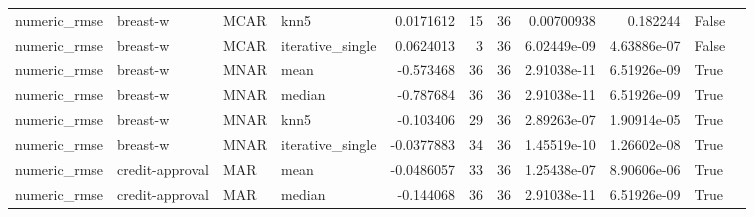 \begin{table}[ht]
\begin{tabular}{llllrrrrrll}
 numeric\_rmse           & breast-w             & MCAR        & knn5             &      0.0171612   &                  15 &      36 & 0.00700938  & 0.182244    & False              &                                                                                                                    \\
 numeric\_rmse           & breast-w             & MCAR        & iterative\_single &      0.0624013   &                   3 &      36 & 6.02449e-09 & 4.63886e-07 & False              &                                                                                                                    \\
 numeric\_rmse           & breast-w             & MNAR        & mean             &     -0.573468    &                  36 &      36 & 2.91038e-11 & 6.51926e-09 & True               &                                                                                                                    \\
 numeric\_rmse           & breast-w             & MNAR        & median           &     -0.787684    &                  36 &      36 & 2.91038e-11 & 6.51926e-09 & True               &                                                                                                                    \\
 numeric\_rmse           & breast-w             & MNAR        & knn5             &     -0.103406    &                  29 &      36 & 2.89263e-07 & 1.90914e-05 & True               &                                                                                                                    \\
 numeric\_rmse           & breast-w             & MNAR        & iterative\_single &     -0.0377883   &                  34 &      36 & 1.45519e-10 & 1.26602e-08 & True               &                                                                                                                    \\
 numeric\_rmse           & credit-approval      & MAR         & mean             &     -0.0486057   &                  33 &      36 & 1.25438e-07 & 8.90606e-06 & True               &                                                                                                                    \\
 numeric\_rmse           & credit-approval      & MAR         & median           &     -0.144068    &                  36 &      36 & 2.91038e-11 & 6.51926e-09 & True               &                                                                                                                    \\

\end{tabular}
\end{table}

